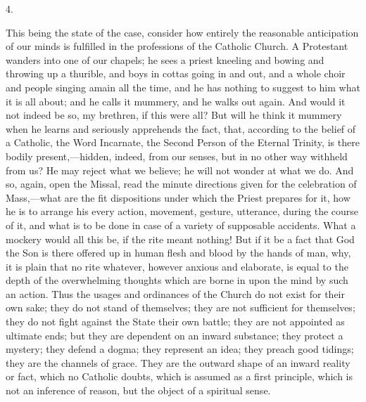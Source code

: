 4.

This being the state of the case, consider how entirely the
reasonable anticipation of our minds is fulfilled in the professions
of the Catholic Church. A Protestant wanders into one of our chapels;
he sees a priest kneeling and bowing and throwing up a thurible, and
boys in cottas going in and out, and a whole choir and people singing
amain all the time, and he has nothing to suggest to him what it is
all about; and he calls it mummery, and he walks out again. And would
it not indeed be so, my brethren, if this were all? But will he think
it mummery when he learns and seriously apprehends the fact, that,
according to the belief of a Catholic, the Word Incarnate, the Second
Person of the Eternal Trinity, is there bodily present,—hidden,
indeed, from our senses, but in no other way withheld from us? He may
reject what we believe; he will not wonder at what we do. And so,
again, open the Missal, read the minute directions given for the
celebration of Mass,—what are the fit dispositions under which the
Priest prepares for it, how he is to arrange his every action,
movement, gesture, utterance, during the course of it, and what is to
be done in case of a variety of supposable accidents. What a mockery
would all this be, if the rite meant nothing! But if it be a fact that
God the Son is there offered up in human flesh and blood by the hands
of man, why, it is plain that no rite whatever, however anxious and
elaborate, is equal to the depth of the overwhelming thoughts which
are borne in upon the mind by such an action. Thus the usages and
ordinances of the Church do not exist for their own sake; they do not
stand of themselves; they are not sufficient for themselves; they do
not fight against the State their own battle; they are not appointed
as ultimate ends; but they are dependent on an inward substance; they
protect a mystery; they defend a dogma; they represent an idea; they
preach good tidings; they are the channels of grace. They are the
outward shape of an inward reality or fact, which no Catholic doubts,
which is assumed as a first principle, which is not an inference of
reason, but the object of a spiritual sense.

